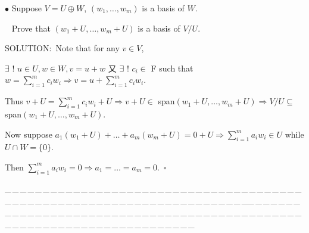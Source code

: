 \documentclass[a4paper, 11pt, UTF8]{article}
\begin{document}
\begin{large}
{\small $\bullet$} {\timessl\Large 
Suppose $V=U\oplus W$, $(w_1,\dots,w_m)$ is a basis of $W$.}\par\,\,\,
{\timessl\Large Prove that $(w_1+U,\dots,w_m+U)$ is a basis of $V/U$.
}\par
{\timesbf S\footnotesize{OLUTION:}}\,\,\,Note that for any $v\in V$,\par\quad
$\exists\,\,!\,\,u\in U,w\in W,v=u+w$ 又 $\exists\,\,!\,\,c_i\in$ {\timesbf F} such that $w=\sum\limits_{i=1}^m c_i w_i\Rightarrow v=u+\sum\limits_{i=1}^m c_i w_i$.\par\quad
Thus $v+U=\sum\limits_{i=1}^m c_i w_i+U\Rightarrow v+U\in$ span$(w_1+U,\dots,w_m+U)\Rightarrow V/U\subseteq$ span$(w_1+U,\dots,w_m+U)$.\par\quad
Now suppose $a_1(w_1+U)+\dots+a_m(w_m+U)=0+U\Rightarrow\sum\limits_{i=1}^m a_i w_i\in U$ while $U\cap W=\{0\}$.\par\quad
Then $\sum\limits_{i=1}^m a_i w_i=0\Rightarrow a_1=\dots=a_m=0.\,\,\,\square$
\par
{\tiny \_\,\_\,\_\,\_\,\_\,\_\,\_\,\_\,\_\,\_\,\_\,\_\,\_\,\_\,\_\,\_\,\_\,\_\,\_\,\_\,\_\,\_\,\_\,\_\,\_\,\_\,\_\,\_\,\_\,\_\,\_\,\_\,\_\,\_\,\_\,\_\,\_\,\_\,\_\,\_\,\_\,\_\,\_\,\_\,\_\,\_\,\_\,\_\,\_\,\_\,\_\,\_\,\_\,\_\,\_\,\_\,\_\,\_\,\_\,\_\,\_\,\_\,\_\,\_\,\_\,\_\,\_\,\_\,\_\,\_\,\_\_\,\_\,\_\,\_\,\_\,\_\,\_\,\_\,\_\,\_\,\_\,\_\,\_\,\_\,\_\,\_\,\_\,\_\,\_\,\_\,\_\,\_\,\_\,\_\,\_\,\_\,\_\,\_\,\_\,\_\,\_\,\_\,\_\,\_\,\_\,\_\,\_\,\_\,\_\,\_\,\_\,\_\,\_\,\_\,\_\,\_\,\_\,\_\,\_\,\_\,\_\,\_\,\_\,\_\,\_\,\_\,\_\,\_\,\_\,\_\,\_\,\_\,\_\,\_\,\_\,\_\,\_\,\_\,\_\,\_\,\_}\par


\end{large}
\end{document}
